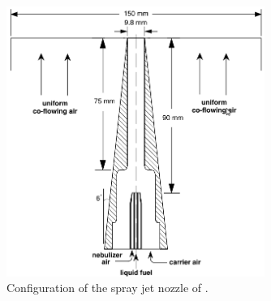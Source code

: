 \documentclass[preprint,12pt,review]{elsarticle}
\begin{document}
\begin{figure}
 \centering
 \includegraphics[width=0.75\textwidth]{../thesis/figuras/chap3/setup.png}
 \caption{Configuration of the spray jet nozzle of \citet{chen}.}
 \label{spray_jet}
\end{figure}
\end{document}

